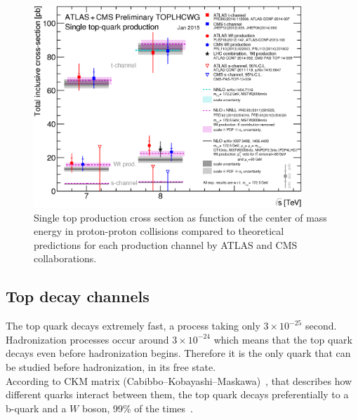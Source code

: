 \begin{figure}[!Hhtbp]
  \begin{center}
    \includegraphics[width=0.9\textwidth]{figs/singletop_allchanvsroots.png}
    \caption{Single top production cross section as function of the center of mass energy in proton-proton collisions compared to theoretical predictions for each production channel by ATLAS and CMS collaborations.}
    \label{fig:SingleProduction}
  \end{center}
\end{figure}


\subsection{Top decay channels}

The top quark decays extremely fast, a process taking only $3\times 10^{-25}$ second. Hadronization processes occur around $3\times 10^{-24}$ which means that the top quark decays even before hadronization begins. Therefore it is the only quark that can be studied before hadronization, in its free state. \\ According to CKM matrix (Cabibbo–Kobayashi–Maskawa)~\cite{PhysRevLett.10.531, Kobayashi01021973}, that describes how different quarks interact between them, the top quark decays preferentially to a b-quark and a $W$ boson, 99\% of the times~\cite{Agashe:2014kda}. 

